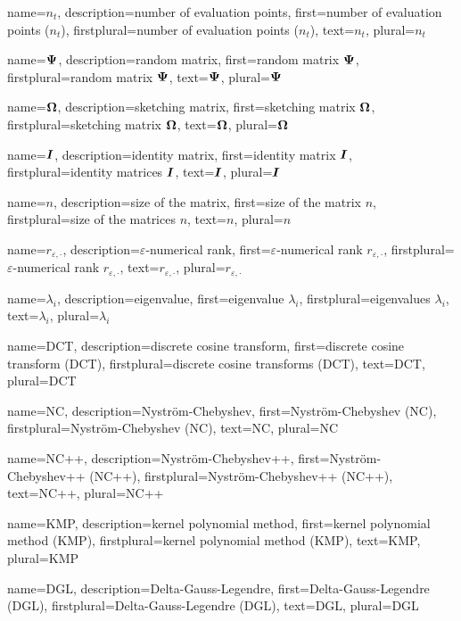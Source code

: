{%
  name={$n_t$},%
  description={number of evaluation points},%
  first={number of evaluation points ($n_t$)},%
  firstplural={number of evaluation points ($n_t$)},%
  text={$n_t$},%
  plural={$n_t$}%
}

{%
  name={$\boldsymbol{\Psi}$},%
  description={random matrix},%
  first={random matrix $\boldsymbol{\Psi}$},%
  firstplural={random matrix $\boldsymbol{\Psi}$},%
  text={$\boldsymbol{\Psi}$},%
  plural={$\boldsymbol{\Psi}$}%
}

{%
  name={$\boldsymbol{\Omega}$},%
  description={sketching matrix},%
  first={sketching matrix $\boldsymbol{\Omega}$},%
  firstplural={sketching matrix $\boldsymbol{\Omega}$},%
  text={$\boldsymbol{\Omega}$},%
  plural={$\boldsymbol{\Omega}$}%
}

{%
  name={$\boldsymbol{I}$},%
  description={identity matrix},%
  first={identity matrix $\boldsymbol{I}$},%
  firstplural={identity matrices $\boldsymbol{I}$},%
  text={$\boldsymbol{I}$},%
  plural={$\boldsymbol{I}$}%
}

{%
  name={$n$},%
  description={size of the matrix},%
  first={size of the matrix $n$},%
  firstplural={size of the matrices $n$},%
  text={$n$},%
  plural={$n$}%
}

{%
  name={$r_{\varepsilon, \cdot}$},%
  description={$\varepsilon$-numerical rank},%
  first={$\varepsilon$-numerical rank $r_{\varepsilon, \cdot}$},%
  firstplural={$\varepsilon$-numerical rank $r_{\varepsilon, \cdot}$},%
  text={$r_{\varepsilon, \cdot}$},%
  plural={$r_{\varepsilon, \cdot}$}%
}

{%
  name={$\lambda_i$},%
  description={eigenvalue},%
  first={eigenvalue $\lambda_i$},%
  firstplural={eigenvalues $\lambda_i$},%
  text={$\lambda_i$},%
  plural={$\lambda_i$}%
}

{%
  name={DCT},%
  description={discrete cosine transform},%
  first={discrete cosine transform (DCT)},%
  firstplural={discrete cosine transforms (DCT)},%
  text={DCT},%
  plural={DCT}%
}

{%
  name={NC},%
  description={Nystr\"om-Chebyshev},%
  first={Nystr\"om-Chebyshev (NC)},%
  firstplural={Nystr\"om-Chebyshev (NC)},%
  text={NC},%
  plural={NC}%
}

{%
  name={NC++},%
  description={Nystr\"om-Chebyshev++},%
  first={Nystr\"om-Chebyshev++ (NC++)},%
  firstplural={Nystr\"om-Chebyshev++ (NC++)},%
  text={NC++},%
  plural={NC++}%
}

{%
  name={KMP},%
  description={kernel polynomial method},%
  first={kernel polynomial method (KMP)},%
  firstplural={kernel polynomial method (KMP)},%
  text={KMP},%
  plural={KMP}%
}

{%
  name={DGL},%
  description={Delta-Gauss-Legendre},%
  first={Delta-Gauss-Legendre (DGL)},%
  firstplural={Delta-Gauss-Legendre (DGL)},%
  text={DGL},%
  plural={DGL}%
}
